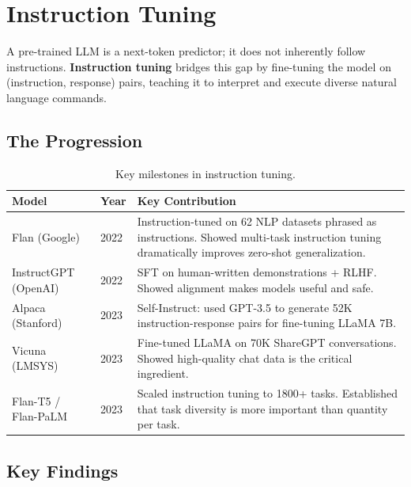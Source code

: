 \section{Instruction Tuning}
\label{sec:instruction_tuning}

A pre-trained LLM is a next-token predictor; it does not inherently follow
instructions.  \textbf{Instruction tuning} bridges this gap by fine-tuning
the model on (instruction, response) pairs, teaching it to interpret and
execute diverse natural language commands.

\subsection{The Progression}

\begin{table}[H]
\centering
\small
\begin{tabularx}{\textwidth}{@{}l l X@{}}
\toprule
\textbf{Model} & \textbf{Year} & \textbf{Key Contribution} \\
\midrule
Flan (Google)       & 2022 & Instruction-tuned on 62 NLP datasets phrased as
  instructions.  Showed multi-task instruction tuning dramatically improves
  zero-shot generalization. \\
InstructGPT (OpenAI) & 2022 & SFT on human-written demonstrations + RLHF.
  Showed alignment makes models useful and safe. \\
Alpaca (Stanford)   & 2023 & Self-Instruct: used GPT-3.5 to generate 52K
  instruction-response pairs for fine-tuning LLaMA 7B. \\
Vicuna (LMSYS)      & 2023 & Fine-tuned LLaMA on 70K ShareGPT conversations.
  Showed high-quality chat data is the critical ingredient. \\
Flan-T5 / Flan-PaLM & 2023 & Scaled instruction tuning to 1800+ tasks.
  Established that task diversity is more important than quantity per task. \\
\bottomrule
\end{tabularx}
\caption{Key milestones in instruction tuning.}
\label{tab:instruction_tuning}
\end{table}

\subsection{Key Findings}

